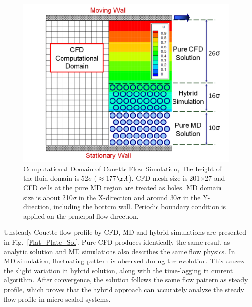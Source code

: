 \documentclass{CFD2010paper}
\begin{document}
%
\begin{figure}[ht]
\centering
\includegraphics[width=0.6\linewidth]{Couette_Val_Domain.pdf}
\vskip-0.2cm
\caption{Computational Domain of Couette Flow Simulation; The height of the fluid domain is 52$\sigma$ ($\approx$177$\AA$). CFD mesh size is 201$\times$27 and CFD cells at the pure MD region are treated as holes. MD domain size is about 210$\sigma$ in the X-direction and around 30$\sigma$ in the Y-direction, including the bottom wall. Periodic boundary condition is applied on the principal flow direction.}
\label{Couette_Val_Domain}
\end{figure}



Unsteady Couette flow profile by CFD, MD and hybrid simulations are presented in Fig.~\ref{Flat_Plate_Sol}. Pure CFD produces identically the same result as analytic solution and MD simulations also describes the same flow physics. In MD simulation, fluctuating pattern is observed during the evolution. This causes the slight variation in hybrid solution, along with the time-lagging in current algorithm. After convergence, the solution follows the same flow pattern as steady profile, which proves that the hybrid approach can accurately analyze the steady flow profile in micro-scaled systems.
\end{document}
